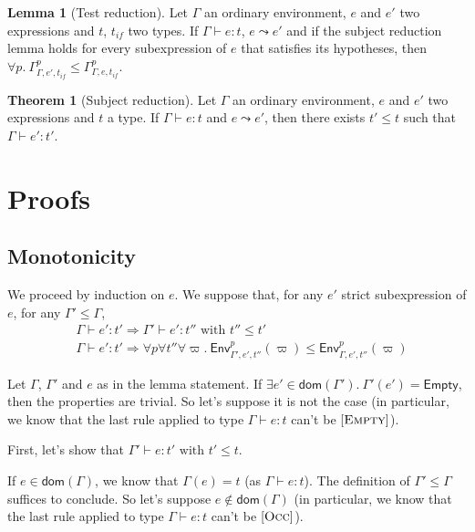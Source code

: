 \documentclass[a4paper]{article}%
\newcommand{\dom}[1]{\textsf{dom}(#1)}
\newcommand{\Empty} {\textsf{Empty}}%
\newcommand{\Gp}[2]{\textsf{Env}^{#1}_{#2}}
\theoremstyle{definition}
\newtheorem{theorem}{Theorem}
\newtheorem{lemma}{Lemma}
\newcommand {\Rule}[1] {[\textsc{#1}]}
\begin{document}
    \begin{lemma}[Test reduction]
      Let $\Gamma$ an ordinary environment, $e$ and $e'$ two expressions and $t$, $t_{if}$ two types.
      If $\Gamma \vdash e : t$, $e \leadsto e'$ and
      if the subject reduction lemma holds for every subexpression of $e$ that satisfies its hypotheses,
      then $\forall p.\ \Gamma^p_{\Gamma,e',t_{if}} \leq \Gamma^p_{\Gamma,e,t_{if}}$.
    \end{lemma}

    \begin{theorem}[Subject reduction]
      Let $\Gamma$ an ordinary environment, $e$ and $e'$ two expressions and $t$ a type.
      If $\Gamma \vdash e : t$ and $e \leadsto e'$, then there exists $t' \leq t$ such that $\Gamma \vdash e' : t'$.
    \end{theorem}

    \section{Proofs}

    \subsection{Monotonicity}

    We proceed by induction on $e$. We suppose that, for any $e'$ strict subexpression of $e$, for any $\Gamma' \leq \Gamma$,
    \begin{align*}
      &\Gamma \vdash e':t' \Rightarrow \Gamma' \vdash e':t'' \text{ with } t'' \leq t'\\
      &\Gamma \vdash e':t' \Rightarrow \forall p \forall t'' \forall \varpi.\ \Gp p {\Gamma',e',t''} (\varpi) \leq \Gp p {\Gamma,e',t''} (\varpi)
    \end{align*}

    Let $\Gamma$, $\Gamma'$ and $e$ as in the lemma statement.
    If $\exists e' \in \dom {\Gamma'}.\ \Gamma'(e') = \Empty$, then the properties are trivial.
    So let's suppose it is not the case (in particular, we know that the last rule applied to type $\Gamma \vdash e:t$ can't be $\Rule{Empty}$).

    First, let's show that $\Gamma' \vdash e:t' \text{ with } t' \leq t$.

    If $e\in\dom\Gamma$, we know that $\Gamma(e)=t$ (as $\Gamma \vdash e:t$). The definition of $\Gamma' \leq \Gamma$ suffices to conclude.
    So let's suppose $e\not\in\dom\Gamma$ (in particular, we know that the last rule applied to type $\Gamma \vdash e:t$ can't be $\Rule{Occ}$).
\end{document}
